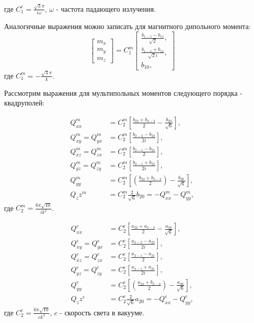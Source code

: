 где $C_1^e = \frac{\sqrt{3} \pi}{i \omega}$, $\omega$ - частота падающего излучения.

Аналогичные выражения можно записать для магнитного дипольного момента:
\begin{equation}
    \begin{bmatrix}
        m_x \\
        m_y \\
        m_z
    \end{bmatrix} = C_1^m \begin{bmatrix}
        \frac{b_{1-1} - b_{11}}{\sqrt{2}},\\
        \frac{b_{1-1}+b_{11}}{\sqrt{2}i},\\
        b_{10},
    \end{bmatrix}
\end{equation}
где $C_1^m = -\frac{\sqrt{3} \pi}{k}$.

Рассмотрим выражения для мультипольных моментов следующего порядка - квадруполей:

\begin{align*}
    Q_{xx}^m &= C^m_2 \left[ \frac{b_{22}+b_{2-2}}{2} - \frac{b_{20}}{\sqrt{6}} \right], \\
    Q_{xy}^m = Q_{yx}^m &= C^m_2 \left[ \frac{b_{2-2}-b_{22}}{2 i} \right], \\
    Q_{xz}^m = Q_{zx}^m &= C^m_2 \left[ \frac{b_{2-1}-b_{21}}{2}  \right],\\
    Q_{yz}^m = Q_{zy}^m &= C^m_2 \left[ \frac{b_{2-1}+b_{21}}{2i} \right],\\
    Q_{yy}^m &= C^m_2 \left[ \left( \frac{b_{22}+b_{2-2}}{2} \right)  -\frac{b_{20}}{\sqrt{6}}\right],\\
    Q_zz^m &= C^m_2 \frac{2 }{\sqrt{6}} b_{20} = -Q_{xx}^m -Q_{yy}^m,
\end{align*}
где $C_2^m = \frac{6 \pi \sqrt{10}}{i k^2}$. 

\begin{align*}
    Q_{xx}^e &= C_2^e \left[ \frac{a_{22}+a_{2-2}}{2} - \frac{a_{20}}{\sqrt{6}} \right], \\
    Q_{xy}^e = Q_{yx}^e &= C_2^e \left[ \frac{a_{2-2}-a_{22}}{2 i} \right], \\
    Q_{xz}^e = Q_{zx}^e &= C_2^e \left[ \frac{a_{2-1}-a_{21}}{2}  \right],\\
    Q_{yz}^e = Q_{zy}^e &= C_2^e \left[ \frac{a_{2-1}+a_{21}}{2i} \right],\\
    Q_{yy}^e &= C_2^e \left[ \left( \frac{a_{22}+b_{2-2}}{2} \right)  -\frac{a_{20}}{\sqrt{6}}\right],\\
    Q_zz^e &= C_2^e \frac{2 }{\sqrt{6}} a_{20} = -Q_{xx}^e -Q_{yy}^e,
\end{align*}
где $C_2^e = \frac{6 \pi \sqrt{10}}{c k^2}$, $c$ - скорость света в вакууме. 

